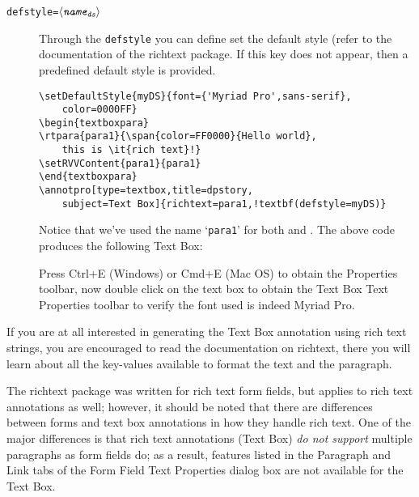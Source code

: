 \documentclass[12pt]{article}
\def\pkg{\textsf}
\let\app\textsf
\let\opt\texttt
\let\uif\textsf
\def\ameta#1{$\langle\textit{\texttt{#1}}\rangle$}
\def\SUB#1{\ensuremath{{}_{\text{#1}}}}
\begin{document}
\begin{description}
    \item[\texttt{defstyle=\ameta{name\SUB{ds}}}] Through the
        \opt{defstyle} you can define set the default style (refer to the
        documentation of the \pkg{richtext} package. If this key does not
        appear, then a predefined default style is provided.
\begin{Verbatim}[fontsize=\small,commandchars=!()]
\setDefaultStyle{myDS}{font={'Myriad Pro',sans-serif},
    color=0000FF}
\begin{textboxpara}
\rtpara{para1}{\span{color=FF0000}{Hello world},
    this is \it{rich text}!}
\setRVVContent{para1}{para1}
\end{textboxpara}
\annotpro[type=textbox,title=dpstory,
    subject=Text Box]{richtext=para1,!textbf(defstyle=myDS)}
\end{Verbatim}
Notice that we've used the name `\texttt{para1}' for both 
and . The above code produces the following \uif{Text Box}:
\begin{flushleft}%
\begin{minipage}{2in}
\begin{textboxpara}
\end{textboxpara}
\end{minipage}\hfill
\begin{minipage}{\linewidth-2in-10pt}\small
Press \uif{Ctrl+E} (\app{Windows}) or \uif{Cmd+E} (\app{Mac OS}) to
obtain the \uif{Properties} toolbar, now double click on the text box to
obtain the \uif{Text Box Text Properties} toolbar to verify the font used
is indeed Myriad Pro.
\end{minipage}
\end{flushleft}
\end{description}
If you are at all interested in generating the \uif{Text Box} annotation using rich text
strings, you are encouraged to read the documentation on \pkg{richtext},
there you will learn about all the key-values available to format the text
and the paragraph.

The \pkg{richtext} package was written for rich text form fields, but applies
to rich text annotations as well; however, it should be noted that there are
differences between forms and text box annotations in how they handle rich
text. One of the major differences is that rich text annotations (\uif{Text
Box}) \emph{do not support} multiple paragraphs as form fields do; as a
result, features listed in the \uif{Paragraph} and \uif{Link} tabs of the
\uif{Form Field Text Properties} dialog box are not available for the
\uif{Text Box}.
\end{document}
